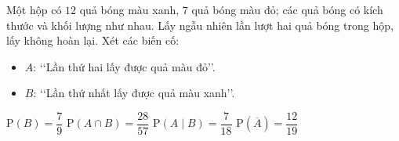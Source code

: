 \begin{ex}%
	Một hộp có $12$ quả bóng màu xanh, $7$ quả bóng màu đỏ; các quả bóng có kích thước và khối lượng như nhau. Lấy ngẫu nhiên lần lượt hai  quả bóng trong hộp, lấy không hoàn lại. Xét các biến cố:
	\begin{itemize}
		\item $A$:  \lq\lq Lần thứ hai lấy được quả màu đỏ\rq\rq.
		 \item $B$: \lq\lq Lần thứ nhất lấy được quả màu xanh\rq\rq.
	\end{itemize}
	 \choiceTF
		{$\mathrm{P}(B)=\dfrac{7}{9}$} 
		{$\mathrm{P}\left(A\cap  B\right)=\dfrac{28}{57}$}
		 {\True $\mathrm{P}\left(A\mid B\right)=\dfrac{7}{18}$}
		 {\True $\mathrm{P}\left(\overline{A}\right)=\dfrac{12}{19}$}
\end{ex}

